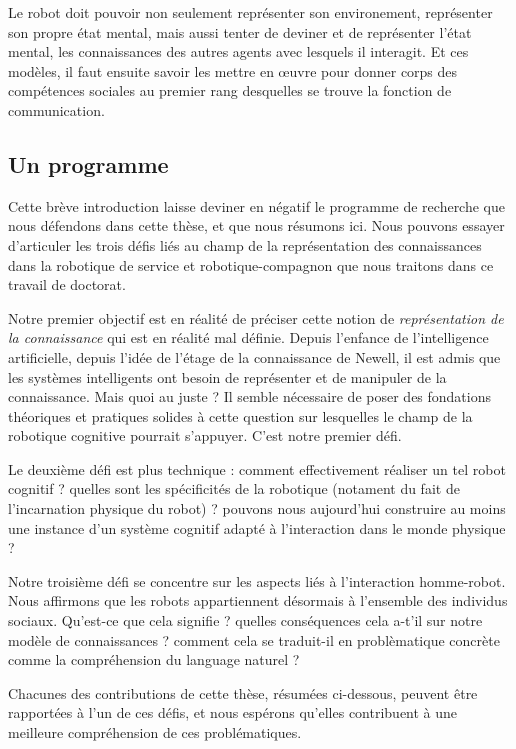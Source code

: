 Le robot doit pouvoir non seulement représenter son environement, représenter
son propre état mental, mais aussi tenter de deviner et de représenter l'état
mental, les connaissances des autres agents avec lesquels il interagit. Et ces
modèles, il faut ensuite savoir les mettre en \oe uvre pour donner corps  des
compétences sociales au premier rang desquelles se trouve la fonction de
communication.

\subsection{Un programme}
\label{sect|challenges}

Cette brève introduction laisse deviner en négatif le programme de recherche que nous
défendons dans cette thèse, et que nous résumons ici. Nous pouvons essayer
d'articuler les trois défis liés au champ de la représentation des
connaissances dans la robotique de service et robotique-compagnon que nous
traitons dans ce travail de doctorat.

Notre premier objectif est en réalité de préciser cette notion de
\emph{représentation de la connaissance} qui est en réalité mal définie. Depuis
l'enfance de l'intelligence artificielle, depuis l'idée de \og  l'étage de la
connaissance \fg de Newell, il est admis que les systèmes intelligents ont
besoin de représenter et de manipuler de la connaissance. Mais quoi au juste ?
Il semble nécessaire de poser des fondations théoriques et pratiques solides à
cette question sur lesquelles le champ de la robotique cognitive pourrait
s'appuyer. C'est notre premier défi.

Le deuxième défi est plus technique : comment effectivement réaliser un tel
robot cognitif ? quelles sont les spécificités de la robotique (notament du
fait de l'incarnation physique du robot) ? pouvons nous aujourd'hui construire
au moins une instance d'un système cognitif adapté à l'interaction dans le
monde physique ?

Notre troisième défi se concentre sur les aspects liés à l'interaction
homme-robot. Nous affirmons que les robots appartiennent désormais à l'ensemble
des individus sociaux. Qu'est-ce que cela signifie ? quelles conséquences cela
a-t'il sur notre modèle de connaissances ? comment cela se traduit-il en
problèmatique concrète comme la compréhension du language naturel ?

Chacunes des contributions de cette thèse, résumées ci-dessous, peuvent être
rapportées à l'un de ces défis, et nous espérons qu'elles contribuent à une
meilleure compréhension de ces problématiques.

